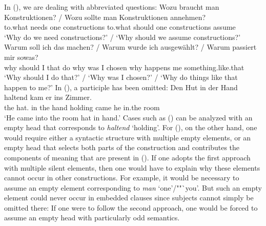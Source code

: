\begin{exe}
\begin{xlist}[iv.]
\begin{exe}
\begin{xlist}[iv.]
\z
In (), we are dealing with abbreviated questions:
\eal
\ex 
\gll Wozu braucht man Konstruktionen? / Wozu sollte man Konstruktionen annehmen?\\
     to.what needs one constructions {} to.what should one constructions assume\\
\glt `Why do we need constructions?' / `Why should we assume constructions?'
\ex 
\gll Warum soll ich das machen? / Warum wurde ich ausgewählt? / Warum passiert mir sowas?\\
	 why should I that do {} why was I chosen {} why happens me something.like.that\\
\glt `Why should I do that?' / `Why was I chosen?' / `Why do things like that happen to me?'
\zl
In (), a participle has been omitted:
\ea
\gll Den Hut in der Hand haltend kam er ins Zimmer.\\
	 the hat.\acc{} in the hand holding came he in.the room\\
\glt `He came into the room hat in hand.'
\z
Cases such as () can be analyzed with an empty head that corresponds to \emph{haltend} `holding'.
For (), on the other hand, one would require either a syntactic structure with multiple empty elements, or an empty head that
selects both parts of the construction and contributes the components of meaning that are present in ().
If one adopts the first approach with multiple silent elements, then one would have to explain why these elements cannot occur in other
constructions. For example, it would be necessary to assume an empty element corresponding to
\emph{man} `one'/""`you'. But such an empty element could never occur in embedded clauses since subjects cannot simply be omitted there:
\z
If one were to follow the second approach, one would be forced to assume an empty head with particularly odd semantics.


\end{xlist}
\end{exe}
\end{xlist}
\end{exe}
